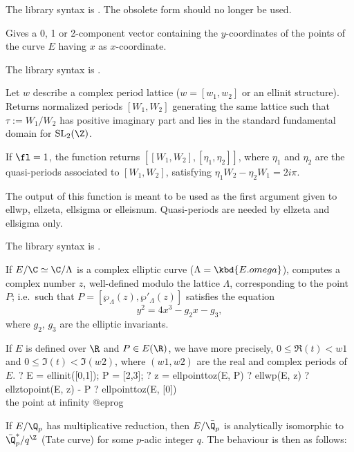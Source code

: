 The library syntax is .
The obsolete form  should no longer be
used.

\label{se:ellordinate}
Gives a 0, 1 or 2-component vector containing
the $y$-coordinates of the points of the curve $E$ having $x$ as
$x$-coordinate.

The library syntax is .

\label{se:ellperiods}
Let $w$ describe a complex period lattice ($w = [w_1,w_2]$
or an ellinit structure). Returns normalized periods $[W_1,W_2]$ generating
the same lattice such that $\tau := W_1/W_2$ has positive imaginary part
and lies in the standard fundamental domain for $\text{SL}_2(\Z)$.

If $\fl = 1$, the function returns $[[W_1,W_2], [\eta_1,\eta_2]]$, where
$\eta_1$ and $\eta_2$ are the quasi-periods associated to
$[W_1,W_2]$, satisfying $\eta_1 W_2 - \eta_2 W_1 = 2 i \pi$.

The output of this function is meant to be used as the first argument
given to ellwp, ellzeta, ellsigma or elleisnum. Quasi-periods are
needed by ellzeta and ellsigma only.

The library syntax is .

\label{se:ellpointtoz}
If $E/\C \simeq \C/\Lambda$ is a complex elliptic curve ($\Lambda =
\kbd{E.omega}$),
computes a complex number $z$, well-defined modulo the lattice $\Lambda$,
corresponding to the point $P$; i.e.~such that
 $P = [\wp_\Lambda(z),\wp'_\Lambda(z)]$
satisfies the equation
$$y^2 = 4x^3 - g_2 x - g_3,$$
where $g_2$, $g_3$ are the elliptic invariants.

If $E$ is defined over $\R$ and $P\in E(\R)$, we have more precisely, $0 \leq
\Re(t) < w1$ and $0 \leq \Im(t) < \Im(w2)$, where $(w1,w2)$ are the real and
complex periods of $E$.
\bprog
? E = ellinit([0,1]); P = [2,3];
? z = ellpointtoz(E, P)
? ellwp(E, z)
? ellztopoint(E, z) - P
? ellpointtoz(E, [0]) \\ the point at infinity
@eprog

If $E/\Q_p$ has multiplicative reduction, then $E/\bar{\Q_p}$ is analytically
isomorphic to $\bar{\Q}_p^*/q^\Z$ (Tate curve) for some $p$-adic integer $q$.
The behaviour is then as follows:

